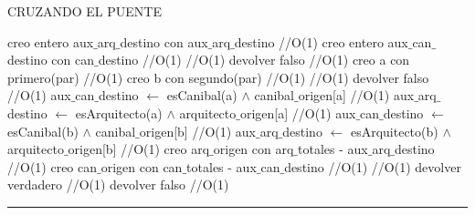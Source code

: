 \begin{algorithm}[H]
\caption{CRUZANDO EL PUENTE}
\begin{algorithmic}[1]
\state creo entero aux$\_$arq$\_$destino con aux$\_$arq$\_$destino \hfill //O(1)
\state creo entero aux$\_$can$\_$destino con can$\_$destino \hfill //O(1)
 \hfill //O(1)
\state devolver  falso \hfill //O(1)
\endif
\state creo a con primero(par) \hfill //O(1)
\state creo b con segundo(par) \hfill //O(1)
 \hfill //O(1)
\state devolver  falso \hfill //O(1)
\endif
\state aux$\_$can$\_$destino $\gets$  esCanibal(a) $\wedge$ canibal$\_$origen[a] \hfill //O(1)
\state aux$\_$arq$\_$destino $\gets$  esArquitecto(a) $\wedge$ arquitecto$\_$origen[a] \hfill //O(1)
\state aux$\_$can$\_$destino $\gets$  esCanibal(b) $\wedge$ canibal$\_$origen[b] \hfill //O(1)
\state aux$\_$arq$\_$destino $\gets$  esArquitecto(b) $\wedge$ arquitecto$\_$origen[b] \hfill //O(1)
\state creo arq$\_$origen con arq$\_$totales - aux$\_$arq$\_$destino \hfill //O(1)
\state creo can$\_$origen con can$\_$totales - aux$\_$can$\_$destino \hfill //O(1)
 \hfill //O(1)
\state devolver  verdadero \hfill //O(1)
\Else
\state devolver  falso \hfill //O(1)
\endif

\EndFunction 
\end{algorithmic}
\hrule
{}
\end{algorithm}


